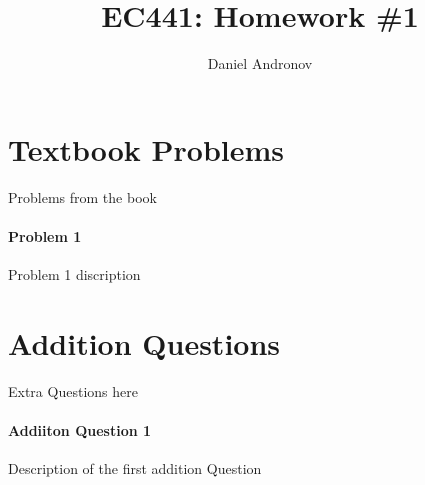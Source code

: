 \documentclass[12pt]{article}
\title{EC441: Homework \#1}
\author{Daniel Andronov}
\date{\displaydate{date}}
\begin{document}
\maketitle

\section{Textbook Problems}
Problems from the book

\paragraph{Problem 1}
Problem 1 discription

\section{Addition Questions}
Extra Questions here

\paragraph{Addiiton Question 1}
Description of the first addition Question
\end{document}

